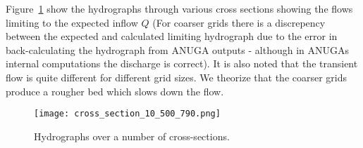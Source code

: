Figure~\ref{fig:hydrographs} show the hydrographs through various cross sections showing the flows limiting to the 
expected inflow $Q$ (For coarser grids there is a discrepency between the expected and calculated limiting 
hydrograph due to the error in back-calculating the hydrograph from ANUGA outputs - although in ANUGAs internal computations the discharge is correct). It is also noted that the transient flow is quite different 
for different grid sizes. We theorize that the coarser grids produce a rougher bed which slows down the flow. 

\begin{figure}
\begin{center}
\texttt{[image: cross\_section\_10\_500\_790.png]}
\caption{Hydrographs over a number of cross-sections.}
\label{fig:hydrographs}
\end{center}
\end{figure}




\endinput
